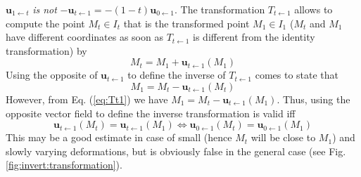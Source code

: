 \begin{attention}
$\mathbf{u}_{1 \leftarrow t}$ \textit{is not} $- \mathbf{u}_{t \leftarrow 1} = - (1-t) \mathbf{u}_{0 \leftarrow 1}$. 
The transformation $T_{t \leftarrow 1}$ allows to compute the point $M_t \in I_t$ that is the transformed point $M_1 \in I_1$ ($M_t$ and $M_1$ have different coordinates as soon as $T_{t \leftarrow 1}$ is different from the identity transformation) by
\begin{equation}
\label{eq:Tt1}
M_t = M_1 + \mathbf{u}_{t \leftarrow 1}(M_1) 
\end{equation}
Using the opposite of $\mathbf{u}_{t \leftarrow 1}$ to define the inverse of $T_{t \leftarrow 1}$ comes to state that
\begin{displaymath}
M_1 = M_t - \mathbf{u}_{t \leftarrow 1}(M_t) 
\end{displaymath}
However, from Eq. (\ref{eq:Tt1}) we have $M_1 = M_t - \mathbf{u}_{t \leftarrow 1}(M_1)$. Thus,  using the opposite vector field to define the inverse transformation is valid iff 
\begin{displaymath}
\mathbf{u}_{t \leftarrow 1}(M_t) = \mathbf{u}_{t \leftarrow 1}(M_1)
\Leftrightarrow 
\mathbf{u}_{0 \leftarrow 1}(M_t) = \mathbf{u}_{0 \leftarrow 1}(M_1)
\end{displaymath}
This may be a good estimate in case of small (hence $M_t$ will be close to $M_1$) and slowly varying deformations, but is obviously false in the general case (see Fig. \ref{fig:invert:transformation}).
\end{attention}

